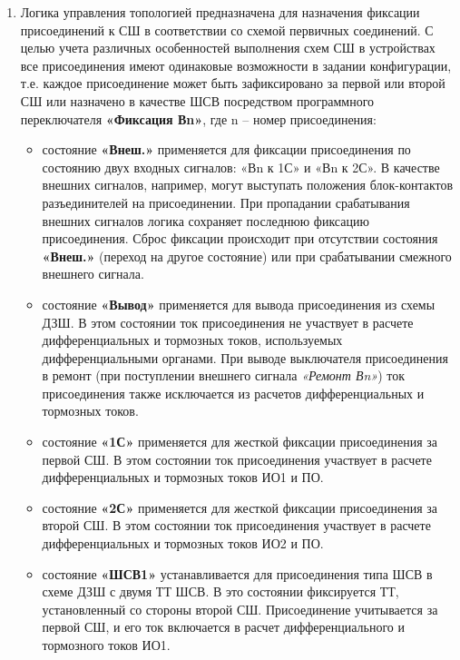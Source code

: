 \color{black}

\begin{enumerate}

\item
Логика управления топологией предназначена для назначения фиксации присоединений к СШ в соответствии со схемой первичных соединений. С целью учета различных особенностей выполнения схем СШ в устройствах все присоединения имеют одинаковые возможности в задании конфигурации, т.е. каждое присоединение может быть зафиксировано за первой или второй СШ или назначено в качестве ШСВ посредством программного переключателя \textbf{«Фиксация Вn»}, где n – номер присоединения:
\begin{itemize} 
\item состояние \textbf{«Внеш.»} применяется для фиксации присоединения по состоянию двух входных сигналов: «Вn к 1С» и «Вn к 2С». В качестве внешних сигналов, например, могут выступать положения блок-контактов разъединителей на присоединении.
При пропадании срабатывания внешних сигналов логика сохраняет последнюю фиксацию присоединения. Сброс фиксации происходит при отсутствии состояния \textbf{«Внеш.»} (переход на другое состояние) или при срабатывании смежного внешнего сигнала.
\item состояние \textbf{«Вывод»} применяется для вывода присоединения из схемы ДЗШ. В этом состоянии ток присоединения не участвует в расчете дифференциальных и тормозных токов, используемых дифференциальными органами.
При выводе выключателя присоединения в ремонт (при поступлении внешнего сигнала \textit{«Ремонт Вn»}) ток присоединения также исключается из расчетов дифференциальных и тормозных токов.
\item состояние \textbf{«1С»} применяется для жесткой фиксации присоединения за первой СШ. В этом состоянии ток присоединения участвует в расчете дифференциальных и тормозных токов ИО1 и ПО.
\item состояние \textbf{«2С»} применяется для жесткой фиксации присоединения за второй СШ. В этом состоянии ток присоединения участвует в расчете дифференциальных и тормозных токов ИО2 и ПО.
\item состояние \textbf{«ШСВ1»} устанавливается для присоединения типа ШСВ в схеме ДЗШ с двумя ТТ ШСВ. В это состоянии фиксируется ТТ, установленный со стороны второй СШ. Присоединение учитывается за первой СШ, и его ток включается в расчет дифференциального и тормозного токов ИО1.

\end{itemize}
\end{enumerate}
